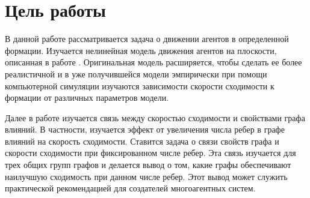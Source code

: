 
\chapter{Цель работы}
В данной работе рассматривается задача о движении агентов в определенной формации. Изучается нелинейная модель движения агентов на плоскости, описанная в работе \cite{veerman2005flocks}. Оригинальная модель расширяется, чтобы сделать ее более реалистичной и в уже получившейся модели эмпирически при помощи компьютерной симуляции изучаются зависимости скорости сходимости к формации от различных параметров модели. 

Далее в работе изучается связь между скоростью сходимости и свойствами графа влияний. В частности, изучается эффект от увеличения числа ребер в графе влияний на скорость сходимости. Ставится задача о связи свойств графа и скорости сходимости при фиксированном числе ребер. Эта связь изучается для трех общих групп графов и делается вывод о том, какие графы обеспечивают наилучшую сходимость при данном числе ребер. Этот вывод может служить практической рекомендацией для создателей многоагентных систем.

\clearpage